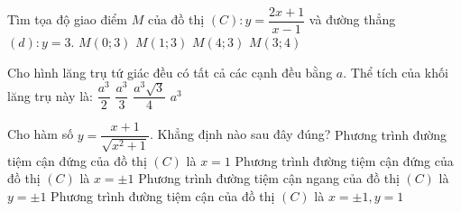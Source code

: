 \begin{ex}%
Tìm tọa độ giao điểm $M$ của đồ thị $(C): y=\dfrac{2x+1}{x-1}$ và đường thẳng $(d): y=3$.
\choice 
{$M(0;3)$}
{$M(1;3)$}
{\True $M(4;3)$}
{$M(3;4)$}
\end{ex}
\begin{ex}%
Cho hình lăng trụ tứ giác đều có tất cả các cạnh đều bằng $a$. Thể tích của khối lăng trụ này là:
\choice 
{$\dfrac{a^3}{2}$}
{$\dfrac{a^3}{3}$}
{\True $\dfrac{a^3\sqrt{3}}{4}$}
{$a^3$}
\end{ex}
\begin{ex}%
Cho hàm số $y=\dfrac{x+1}{\sqrt{x^2+1}}$. Khẳng định nào sau đây đúng?
\choice 
{Phương trình đường tiệm cận đứng của đồ thị $(C)$ là $x=1$}
{Phương trình đường tiệm cận đứng của đồ thị $(C)$ là $x=\pm 1$}
{\True Phương trình đường tiệm cận ngang của đồ thị $(C)$ là $y=\pm 1$}
{Phương trình đường tiệm cận của đồ thị $(C)$ là $x=\pm 1, y=1$}
\end{ex}
